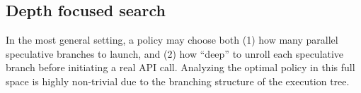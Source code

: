 








\subsection{Depth focused search}
In the most general setting, a policy may choose both (1) how many parallel speculative branches to launch, and (2) how “deep” to unroll each speculative branch before initiating a real API call. Analyzing the optimal policy in this full space is highly non-trivial due to the branching structure of the execution tree.

